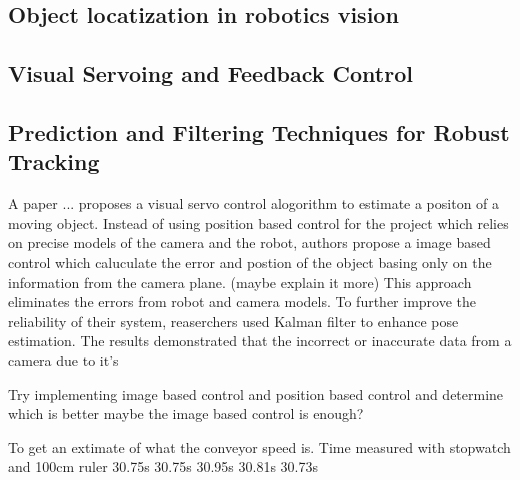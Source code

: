 \subsection{Object locatization in robotics vision}

\subsection{Visual Servoing and Feedback Control}

\subsection{Prediction and Filtering Techniques for Robust Tracking}
A paper ... proposes a visual servo control alogorithm to estimate a positon of
a moving object. Instead of using position based control for the project which relies on
precise models of the camera and the robot, authors propose a image based control which
caluculate the error and postion of the object basing only on the information from the camera
plane. (maybe explain it more) This approach eliminates the errors from robot and camera models.
To further improve the reliability of their system, reaserchers used Kalman filter to
enhance pose estimation. The results demonstrated that the incorrect or inaccurate data
from a camera due to it's 

Try implementing image based control and position based control and determine which is better
maybe the image based control is enough?


To get an extimate of what the conveyor speed is.
Time measured with stopwatch and 100cm ruler
30.75s
30.75s
30.95s
30.81s
30.73s
